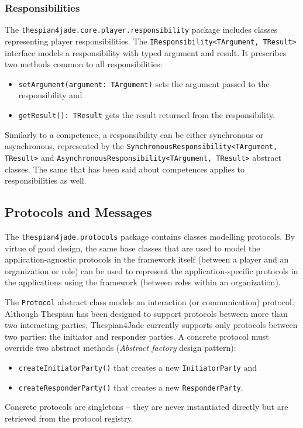 \subsubsection{Responsibilities}

The \texttt{thespian4jade.core.player.responsibility} package includes classes representing player responsibilities.
The \texttt{IResponsibility<TArgument, TResult>} interface models a responsibility with typed argument and result.
It prescribes two methods common to all responsibilities:
\begin{itemize}
	\item \texttt{setArgument(argument: TArgument)} sets the argument passed to the responsibility and
	\item \texttt{getResult(): TResult} gets the result returned from the responsibility.
\end{itemize}

Similarly to a competence, a responsibility can be either synchronous or asynchronous, represented by the \texttt{SynchronousResponsibility<TArgument, TResult>} and \texttt{AsynchronousResponsibility<TArgument, TResult>} abstract classes.
The same that has been said about competences applies to responsibilities as well.

\subsection{Protocols and Messages}

The \texttt{thespian4jade.protocols} package contains classes modelling protocols.
By virtue of good design, the same base classes that are used to model the application-agnostic protocols in the framework itself (between a player and an organization or role) can be used to represent the application-specific protocols in the applications using the framework (between roles within an organization). 

The \texttt{Protocol} abstract class models an interaction (or communication) protocol.
Although Thespian has been designed to support protocols between more than two interacting parties, Thespian4Jade currently supports only protocols between two parties: the initiator and responder parties.
A concrete protocol must override two abstract methods (\textit{Abstract factory} design pattern):
\begin{itemize}
	\item \texttt{createInitiatorParty()} that creates a new \texttt{InitiatorParty} and
	\item \texttt{createResponderParty()} that creates a new \texttt{ResponderParty}.
\end{itemize}
Concrete protocols are singletons -- they are never instantiated directly but are retrieved from the protocol registry.

